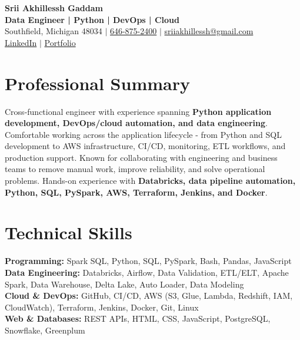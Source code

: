 \documentclass[letterpaper,10pt]{article}
\begin{document}
\fontsize{9.35pt}{10.45pt}\selectfont

\begin{center}
    {\LARGE \textbf{Srii Akhillessh Gaddam}} \\[-1pt]
    \textbf{Data Engineer | Python | DevOps | Cloud} \\[2pt]
    Southfield, Michigan 48034 $|$
    \href{tel:6468752400}{646-875-2400} $|$
    \href{mailto:sriiakhillessh@gmail.com}{sriiakhillessh@gmail.com} \\[1pt]
    \href{https://www.linkedin.com/in/srii-akhiilessh-gaddam-b48668191/}{LinkedIn} $|$
    \href{https://sriiakhillesshg.github.io/portfolio/}{Portfolio}
\end{center}
\vspace{-8pt}

\section{Professional Summary}
\small{Cross-functional engineer with experience spanning \textbf{Python application development, DevOps/cloud automation, and data engineering}. Comfortable working across the application lifecycle - from Python and SQL development to AWS infrastructure, CI/CD, monitoring, ETL workflows, and production support. Known for collaborating with engineering and business teams to remove manual work, improve reliability, and solve operational problems. Hands-on experience with \textbf{Databricks, data pipeline automation, Python, SQL, PySpark, AWS, Terraform, Jenkins, and Docker}.}

\section{Technical Skills}
\small{
\textbf{Programming:} Spark SQL, Python, SQL, PySpark, Bash, Pandas, JavaScript \\
\textbf{Data Engineering:} Databricks, Airflow, Data Validation, ETL/ELT, Apache Spark, Data Warehouse, Delta Lake, Auto Loader, Data Modeling \\
\textbf{Cloud \& DevOps:} GitHub, CI/CD, AWS (S3, Glue, Lambda, Redshift, IAM, CloudWatch), Terraform, Jenkins, Docker, Git, Linux \\
\textbf{Web \& Databases:} REST APIs, HTML, CSS, JavaScript, PostgreSQL, Snowflake, Greenplum
}
\end{document}
